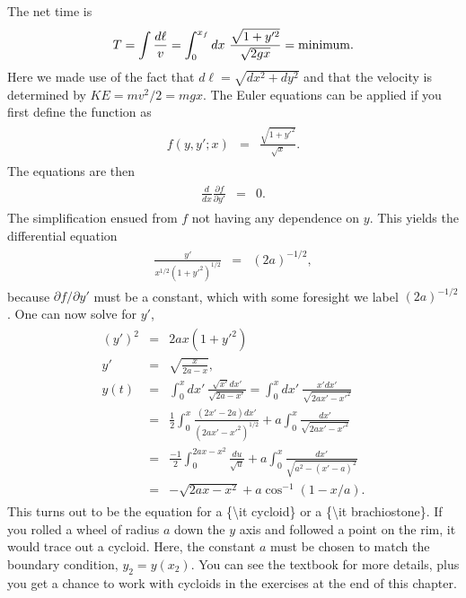 \documentclass[letterpaper,10pt,english]{sphinxmanual}
\begin{document}
The net time is
\begin{equation*}
\begin{split}
T=\int \frac{d\ell}{v}=\int_0^{x_f} dx~\frac{\sqrt{1+y'^2}}{\sqrt{2gx}}={\rm minimum}.
\end{split}
\end{equation*}
Here we made use of the fact that \(d\ell=\sqrt{dx^2+dy^2}\) and that
the velocity is determined by \(KE=mv^2/2=mgx\). The Euler equations can
be applied if you first define the function as
\begin{equation*}
\begin{split}
\begin{eqnarray*}
f(y,y';x)&=&\frac{\sqrt{1+y'^2}}{\sqrt{x}}.
\end{eqnarray*}
\end{split}
\end{equation*}
The equations are then
\begin{equation*}
\begin{split}
\begin{eqnarray*}
\frac{d}{dx}\frac{\partial f}{\partial y'}&=&0.
\end{eqnarray*}
\end{split}
\end{equation*}
The simplification ensued from \(f\) not having any dependence on \(y\). This yields the differential equation
\begin{equation*}
\begin{split}
\begin{eqnarray}
\frac{y'}{x^{1/2}(1+y'^2)^{1/2}}&=&(2a)^{-1/2},
\end{eqnarray}
\end{split}
\end{equation*}
because \(\partial f/\partial y'\) must be a constant, which with some
foresight we label \((2a)^{-1/2}\). One can now solve for \(y'\),
\begin{equation*}
\begin{split}
\begin{eqnarray*}
(y')^2&=&2ax(1+y'^2)\\
\nonumber
y'&=&\sqrt{\frac{x}{2a-x}},\\
\nonumber
y(t)&=&\int_0^x dx'~\frac{\sqrt{x'}dx'}{\sqrt{2a-x'}}=\int_0^x dx'~\frac{x'dx'}{\sqrt{2ax'-x'^2}}\\
\nonumber
&=&\frac{1}{2}\int_0^x\frac{(2x'-2a)dx'}{(2ax'-x'^2)^{1/2}}+a\int_0^x\frac{dx'}{\sqrt{2ax'-x'^2}}\\
\nonumber
&=&\frac{-1}{2}\int_0^{2ax-x^2}\frac{du}{\sqrt{u}}+a\int_0^x\frac{dx'}{\sqrt{a^2-(x'-a)^2}}\\
&=&-\sqrt{2ax-x^2}+a\cos^{-1}(1-x/a).
\end{eqnarray*}
\end{split}
\end{equation*}
This turns out to be the equation for a \{\textbackslash{}it cycloid\} or a \{\textbackslash{}it
brachiostone\}. If you rolled a wheel of radius \(a\) down the \(y\) axis
and followed a point on the rim, it would trace out a cycloid. Here,
the constant \(a\) must be chosen to match the boundary condition,
\(y_2=y(x_2)\). You can see the textbook for more details, plus you get
a chance to work with cycloids in the exercises at the end of this
chapter.
\end{document}
